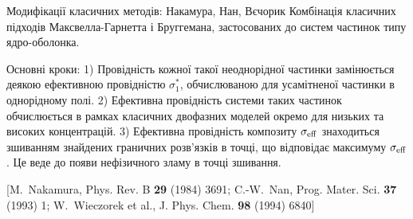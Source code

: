 \documentclass[10pt]{beamer}
\begin{document}
\begin{frame}{Модифікації класичних методів: Накамура, Нан, Вєчорик}
\footnotesize
    Комбінація класичних підходів Максвелла-Гарнетта і Бруггемана, застосованих до систем частинок типу ядро-оболонка.  
    
    Основні кроки: 1) Провідність кожної такої неоднорідної частинки замінюється деякою ефективною провідністю $\sigma^{*}_1$, обчислюваною для усамітненої частинки в однорідному полі.  2) Ефективна провідність системи таких частинок обчислюється в рамках класичних двофазних моделей окремо для низьких та високих концентрацій. 3) Ефективна провідність композиту $\sigma_{\rm eff}$ знаходиться зшиванням знайдених  граничних розв'язків в точці,  що відповідає максимуму $\sigma_{\rm eff}$. Це веде до появи нефізичного зламу в точці зшивання.  
    
    [M.~Nakamura, Phys. Rev. B {\bf 29} (1984) 3691; C.-W.~Nan, Prog. Mater. Sci. \textbf{37} (1993) 1; W.~Wieczorek et al., J. Phys. Chem. {\bf 98} (1994) 6840]
  
\end{frame}
\end{document}
